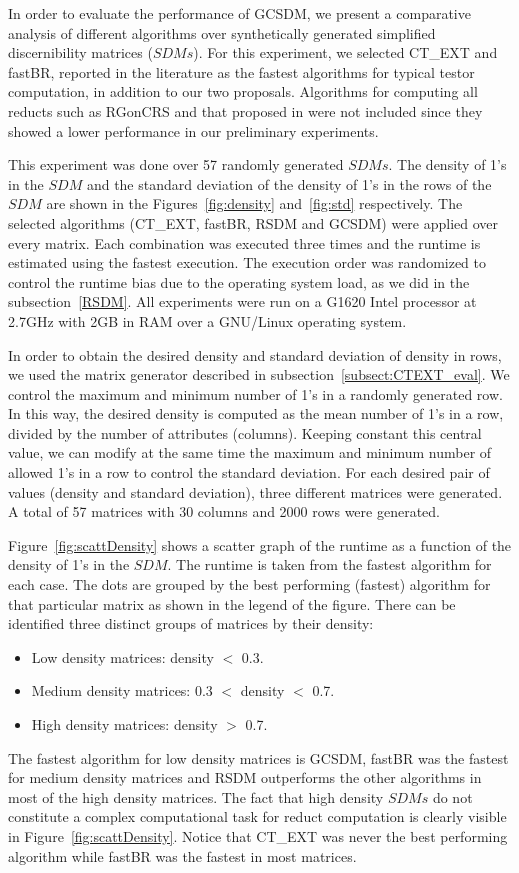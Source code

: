 \documentclass[authoryear,11pt]{elsarticle}
\begin{document}
	In order to evaluate the performance of GCSDM, we present a comparative analysis of different
	algorithms over synthetically generated simplified discernibility matrices ($SDMs$). For this experiment, we
	selected CT\_EXT and fastBR, reported in the literature as the fastest algorithms for typical testor
	computation, in addition to our two proposals. Algorithms for computing all reducts such as RGonCRS
	\citep{WangP07} and that proposed in \citep{Starzyk00} were not included since they showed a lower performance
	in our preliminary experiments. 
	
	This experiment was done over 57 randomly generated $SDMs$. The density of 1's in the $SDM$ and the standard
	deviation of the density of 1's in the rows of the $SDM$ are shown in the Figures~\ref{fig:density} 
	and~\ref{fig:std} respectively. The selected algorithms (CT\_EXT, fastBR, RSDM and GCSDM) were applied over
	every matrix. 
	Each combination was executed three times and the runtime is estimated using the fastest execution. 
	The execution order was randomized to control the runtime bias due to the operating system load, as 
	we did in the subsection~\ref{RSDM}. All experiments were run on a G1620 Intel processor at 2.7GHz with 
	2GB in RAM over a GNU/Linux operating system.
	
	In order to obtain the desired density and standard deviation of density in rows, we used the 
	matrix generator described in subsection~\ref{subsect:CTEXT_eval}. We control the maximum and
	minimum number of 1's in a randomly generated row. In this way, the desired density is computed
	as the mean number of 1's in a row, divided by the number of attributes (columns). Keeping 
	constant this central value, we can modify at the same time the maximum and minimum number of
	allowed 1's in a row to control the standard deviation. For each desired pair of values (density 
	and standard deviation), three different matrices were generated. A total of 57 matrices with
	30 columns and 2000 rows were generated.
	
	Figure~\ref{fig:scattDensity} shows a scatter graph of the runtime as a function of 
	the density of 1's in the $SDM$. The runtime is taken from the fastest algorithm for 
	each case. The dots are grouped by the best performing (fastest)	algorithm for that particular 
	matrix as shown in the legend of the figure. There can be identified three distinct groups of 
	matrices by their density:
	\begin{itemize}
	\item Low density matrices: density $<$ 0.3.
	\item Medium density matrices: 0.3 $<$ density $<$ 0.7.
	\item High density matrices: density $>$ 0.7.
	\end{itemize}
	The fastest algorithm for low density matrices is GCSDM, fastBR was the fastest for
	medium density matrices and RSDM outperforms the other algorithms in most of the high
	density matrices. The fact that high density $SDMs$ do not constitute a complex computational
	task for reduct computation is clearly visible in Figure~\ref{fig:scattDensity}. Notice that
	CT\_EXT was never the best performing algorithm while fastBR was the fastest in most matrices.
		
\end{document}
